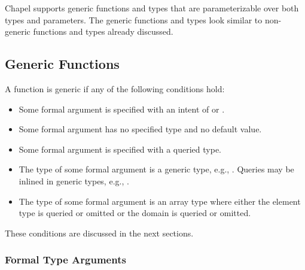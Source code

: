 \label{Generics}

Chapel supports generic functions and types that are parameterizable
over both types and parameters.  The generic functions and types look
similar to non-generic functions and types already discussed.

\subsection{Generic Functions}
\label{Generic_Functions}

A function is generic if any of the following conditions hold:
\begin{itemize}
\item
Some formal argument is specified with an intent of  or
.
\item
Some formal argument has no specified type and no default value.
\item
Some formal argument is specified with a queried type.
\item
The type of some formal argument is a generic type, e.g., .
Queries may be inlined in generic types, e.g., .
\item
The type of some formal argument is an array type where either the
element type is queried or omitted or the domain is queried or
omitted.
\end{itemize}
These conditions are discussed in the next sections.

\subsubsection{Formal Type Arguments}
\label{Formal_Type_Arguments}

